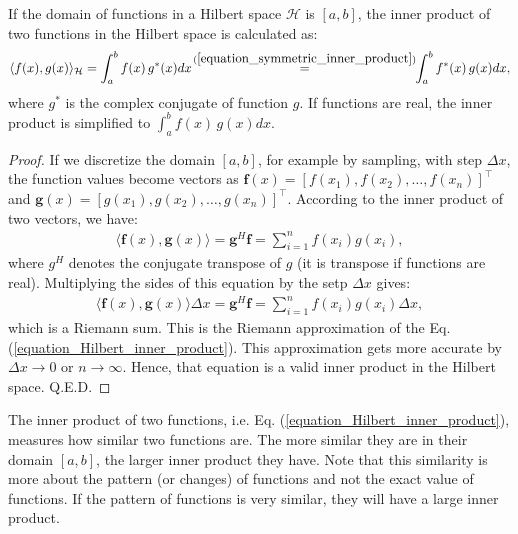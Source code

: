 \documentclass[lang=cn,10pt]{gorgeousnbook}
\numberwithin{equation}{section}%
\numberwithin{figure}{section}%
\begin{document}
\begin{lemma}
If the domain of functions in a Hilbert space $\mathcal{H}$ is $[a,b]$, the inner product of two functions in the Hilbert space is calculated as:
\begin{align}\label{equation_Hilbert_inner_product}
\langle f(x), g(x)  \rangle_\mathcal{H} = \int_a^b f(x)\, g^*(x) dx \!\overset{(\ref{equation_symmetric_inner_product})}{=}\!\! \int_a^b f^*(x)\, g(x) dx,
\end{align}
where $g^*$ is the complex conjugate of function $g$. If functions are real, the inner product is simplified to $\int_a^b f(x)\, g(x) dx$.
\end{lemma}
\begin{proof}
If we discretize the domain $[a,b]$, for example by sampling, with step $\Delta x$, the function values become vectors as $\boldsymbol{f}(x) = [f(x_1), f(x_2), \dots, f(x_n)]^\top$ and $\boldsymbol{g}(x) = [g(x_1), g(x_2), \dots, g(x_n)]^\top$. According to the inner product of two vectors, we have:
\begin{align*}
\langle \boldsymbol{f}(x), \boldsymbol{g}(x)  \rangle = \boldsymbol{g}^H \boldsymbol{f} = \sum_{i=1}^n f(x_i) g(x_i),
\end{align*}
where $g^H$ denotes the conjugate transpose of $g$ (it is transpose if functions are real). Multiplying the sides of this equation by the setp $\Delta x$ gives:
\begin{align*}
\langle \boldsymbol{f}(x), \boldsymbol{g}(x)  \rangle \Delta x = \boldsymbol{g}^H \boldsymbol{f} = \sum_{i=1}^n f(x_i) g(x_i) \Delta x,
\end{align*}
which is a Riemann sum. This is the Riemann approximation of the Eq. (\ref{equation_Hilbert_inner_product}). 
This approximation gets more accurate by $\Delta x \rightarrow 0$ or $n \rightarrow \infty$.
Hence, that equation is a valid inner product in the Hilbert space. Q.E.D.
\end{proof}

\begin{remark}
The inner product of two functions, i.e. Eq. (\ref{equation_Hilbert_inner_product}), measures how similar two functions are. The more similar they are in their domain $[a,b]$, the larger inner product they have. 
Note that this similarity is more about the pattern (or changes) of functions and not the exact value of functions. If the pattern of functions is very similar, they will have a large inner product. 
\end{remark}
\end{document}
